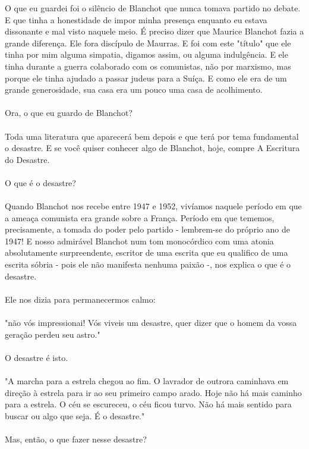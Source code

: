 \documentclass[10pt,a4paper]{book}
\begin{document}
	O que eu guardei foi o silêncio de Blanchot que nunca tomava partido no debate. E que tinha a honestidade de impor minha presença enquanto eu estava dissonante e mal visto naquele meio. É preciso dizer que Maurice Blanchot fazia a grande diferença. Ele fora discípulo de Maurras. E foi com este "título" que ele tinha por mim alguma simpatia, digamos assim, ou alguma indulgência. E ele tinha durante a guerra colaborado com os comunistas, não por marxismo, mas porque ele tinha ajudado a passar judeus para a Suíça. E como ele era de um grande generosidade, sua casa era um pouco uma casa de acolhimento.\\
	\\
	Ora, o que eu guardo de Blanchot?\\
	\\
	Toda uma literatura que aparecerá bem depois e que terá por tema fundamental o desastre. E se você quiser conhecer algo de Blanchot, hoje, compre A Escritura do Desastre.\\
	\\
	O que é o desastre?\\
	\\
	Quando Blanchot nos recebe entre 1947 e 1952, vivíamos naquele período em que a ameaça comunista era grande sobre a França. Período em que tememos, precisamente, a tomada do poder pelo partido - lembrem-se do próprio ano de 1947! E nosso admirável Blanchot num tom monocórdico com uma atonia absolutamente surpreendente, escritor de uma escrita que eu qualifico de uma escrita sóbria - pois ele não manifesta nenhuma paixão -, nos explica o que é o desastre.\\
	\\
	Ele nos dizia para permanecermos calmo: \\
	\\
	"não vós impressionai! Vós viveis um desastre, quer dizer que o homem da vossa geração perdeu seu astro."\\
	\\
	O desastre é isto.\\
	\\
	"A marcha para a estrela chegou ao fim. O lavrador de outrora caminhava em direção à estrela para ir ao seu primeiro campo arado. Hoje não há mais caminho para a estrela. O céu se escureceu, o céu ficou turvo. Não há mais sentido para buscar ou algo que seja. É o desastre."\\
	\\
	Mas, então, o que fazer nesse desastre?\\
	\\
\end{document}
